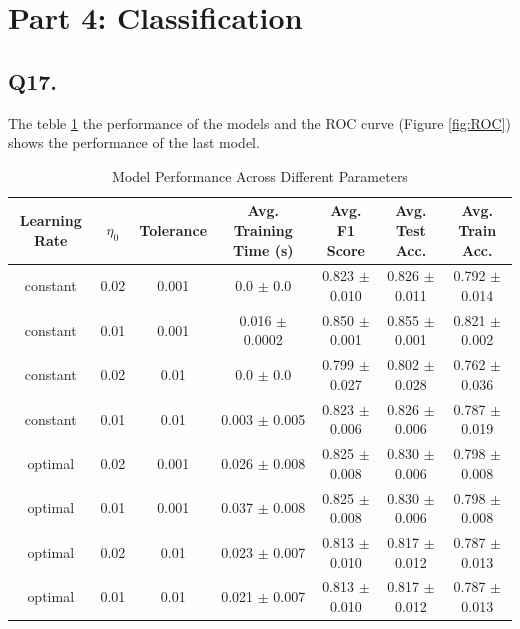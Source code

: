 \documentclass{article}
\begin{document}
\newpage

\section*{Part 4: Classification}

\subsection*{Q17.}

The teble \ref{tab:complete_model_performance} the performance of the models and the ROC curve (Figure \ref{fig:ROC}) shows the performance of the last model.

\begin{table}[htbp]
    \centering
    \small
    \begin{tabular}{ccccccc}
    \toprule
    Learning Rate & $\eta_0$ & Tolerance & Avg. Training Time (s) & Avg. F1 Score & Avg. Test Acc. & Avg. Train Acc. \\
    \midrule
    constant & 0.02 & 0.001 & 0.0 $\pm$ 0.0 & 0.823 $\pm$ 0.010 & 0.826 $\pm$ 0.011 & 0.792 $\pm$ 0.014 \\
    constant & 0.01 & 0.001 & 0.016 $\pm$ 0.0002 & 0.850 $\pm$ 0.001 & 0.855 $\pm$ 0.001 & 0.821 $\pm$ 0.002 \\
    constant & 0.02 & 0.01 & 0.0 $\pm$ 0.0 & 0.799 $\pm$ 0.027 & 0.802 $\pm$ 0.028 & 0.762 $\pm$ 0.036 \\
    constant & 0.01 & 0.01 & 0.003 $\pm$ 0.005 & 0.823 $\pm$ 0.006 & 0.826 $\pm$ 0.006 & 0.787 $\pm$ 0.019 \\
    optimal & 0.02 & 0.001 & 0.026 $\pm$ 0.008 & 0.825 $\pm$ 0.008 & 0.830 $\pm$ 0.006 & 0.798 $\pm$ 0.008 \\
    optimal & 0.01 & 0.001 & 0.037 $\pm$ 0.008 & 0.825 $\pm$ 0.008 & 0.830 $\pm$ 0.006 & 0.798 $\pm$ 0.008 \\
    optimal & 0.02 & 0.01 & 0.023 $\pm$ 0.007 & 0.813 $\pm$ 0.010 & 0.817 $\pm$ 0.012 & 0.787 $\pm$ 0.013 \\
    optimal & 0.01 & 0.01 & 0.021 $\pm$ 0.007 & 0.813 $\pm$ 0.010 & 0.817 $\pm$ 0.012 & 0.787 $\pm$ 0.013 \\
    \bottomrule
    \end{tabular}
    \caption{Model Performance Across Different Parameters}
    \label{tab:complete_model_performance}
\end{table}
    
\end{document}
